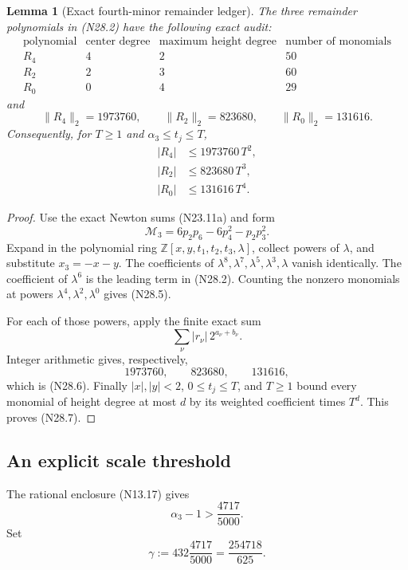 \documentclass[11pt]{article}
\newtheorem{lemma}[theorem]{Lemma}
\theoremstyle{definition}
\theoremstyle{remark}
\begin{document}
\begin{lemma}[Exact fourth-minor remainder ledger]
\label{lem:f2v28-remainders}
The three remainder polynomials in \textup{(N28.2)} have the following
exact audit:
\[
\begin{array}{c|c|c|r}
\text{polynomial}&\text{center degree}&
\text{maximum height degree}&\text{number of monomials}\\ \hline
R_4&4&2&50\\
R_2&2&3&60\\
R_0&0&4&29
\end{array}
\tag{N28.5}
\]
and
\[
 \|R_4\|_2=1973760,\qquad
 \|R_2\|_2=823680,\qquad
 \|R_0\|_2=131616.
 \tag{N28.6}
\]
Consequently, for \(T\geq1\) and
\(\alpha_3\leq t_j\leq T\),
\[
\begin{aligned}
 |R_4|&\leq1973760\,T^2,\\
 |R_2|&\leq823680\,T^3,\\
 |R_0|&\leq131616\,T^4.
\end{aligned}
\tag{N28.7}
\]
\end{lemma}

\begin{proof}
Use the exact Newton sums \textup{(N23.11a)} and form
\[
 \mathcal M_3=6p_2p_6-6p_4^2-p_2p_3^2.
 \tag{N28.8}
\]
Expand in the polynomial ring
\(\mathbb Z[x,y,t_1,t_2,t_3,\lambda]\), collect powers of
\(\lambda\), and substitute \(x_3=-x-y\).  The coefficients of
\(\lambda^8,\lambda^7,\lambda^5,\lambda^3,\lambda\) vanish identically.
The coefficient of \(\lambda^6\) is the leading term in
\textup{(N28.2)}.  Counting the nonzero monomials at powers
\(\lambda^4,\lambda^2,\lambda^0\) gives \textup{(N28.5)}.

For each of those powers, apply the finite exact sum
\[
 \sum_\nu |r_\nu|\,2^{a_\nu+b_\nu}.
 \tag{N28.9}
\]
Integer arithmetic gives, respectively,
\[
 1973760,\qquad823680,\qquad131616,
 \tag{N28.10}
\]
which is \textup{(N28.6)}.  Finally
\(|x|,|y|<2\), \(0\leq t_j\leq T\), and \(T\geq1\) bound every monomial
of height degree at most \(d\) by its weighted coefficient times \(T^d\).
This proves \textup{(N28.7)}.
\end{proof}

\subsection{An explicit scale threshold}
\label{subsec:f2v28-threshold}

The rational enclosure \textup{(N13.17)} gives
\[
 \alpha_3-1>\frac{4717}{5000}.
 \tag{N28.11}
\]
Set
\[
 \gamma:=432\frac{4717}{5000}
 =\frac{254718}{625}.
 \tag{N28.12}
\]
\end{document}
